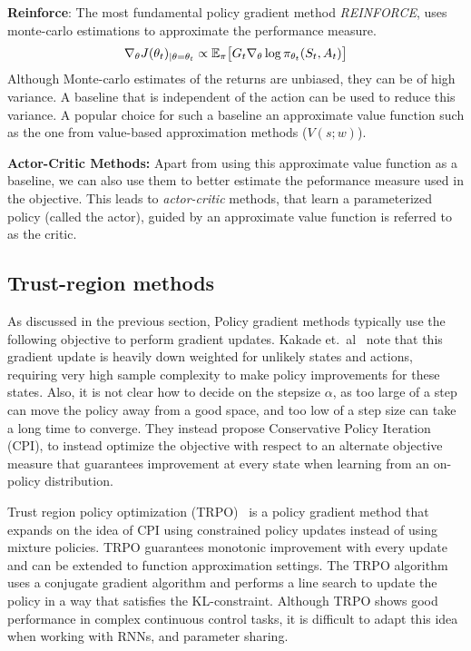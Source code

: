 \textbf{Reinforce}:
The most fundamental policy gradient method \textit{REINFORCE}, uses monte-carlo estimations to approximate
the performance measure.
\begin{equation}
	\label{eqn:reinforce}
	\nabla_\theta J(\theta_t)_{|\theta=\theta_t} \propto \mathbb{E}_\pi \big[ G_t \nabla_\theta \log \pi_{\theta_t}(S_t, A_t) \big]
\end{equation}
Although Monte-carlo estimates of the returns are unbiased, they can be of high variance.
A baseline that is independent of the action can be used to reduce this variance.
A popular choice for such a baseline an approximate value function such as the one from value-based
approximation methods ($V(s;w)$).

\textbf{Actor-Critic Methods:}
Apart from using this approximate value function as a baseline, we can also use them to better
estimate the peformance measure used in the objective.
This leads to \textit{actor-critic} methods, that learn a parameterized policy (called the actor),
guided by an approximate value function is referred to as the critic.

\subsection{Trust-region methods}

As discussed in the previous section, Policy gradient methods typically use the following objective
to perform gradient updates.
Kakade et.~al~\cite{kakadeApproximately2002a} note that this gradient update is heavily down
weighted for unlikely states and actions, requiring very high sample complexity to make policy
improvements for these states.
Also, it is not clear how to decide on the stepsize $\alpha$, as too large of a step can move the
policy away from a good space, and too low of a step size can take a long time to converge.
They instead propose Conservative Policy Iteration (CPI), to instead optimize the objective with
respect to an alternate objective measure that guarantees improvement at every state when learning
from an on-policy distribution.

Trust region policy optimization (TRPO)~\cite{schulmanTrust2015} is a policy gradient method that
expands on the idea of CPI using constrained policy updates instead of using mixture policies.
TRPO guarantees monotonic improvement with every update and can be extended to function
approximation settings.
The TRPO algorithm uses a conjugate gradient algorithm and performs a line search to update the
policy in a way that satisfies the KL-constraint.
Although TRPO shows good performance in complex continuous control tasks, it is difficult to adapt
this idea when working with RNNs, and parameter sharing.

